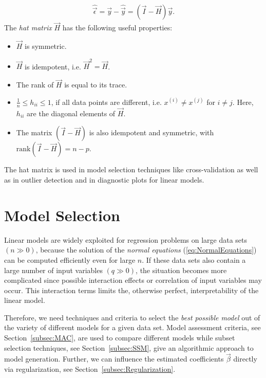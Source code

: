 \documentclass[10pt,a4paper]{report}
\begin{document}
\begin{align} \label{eq:residal_with_hat_matrix}
	\hat{\vec{\epsilon}} = \vec{y} - \hat{\vec{y}} = (\vec{I} - \vec{H}) \vec{y}.
\end{align}
%
The \emph{hat matrix} $\vec{H}$ has the following useful properties:

\begin{itemize}
	\item $\vec{H}$ is symmetric.
	\item $\vec{H}$ is idempotent, i.e. $\vec{H}^2 = \vec{H}$.
	\item The rank of $\vec{H}$ is equal to its trace.
 	\item $\frac{1}{n} \le h_{ii} \le 1$, if all data points are different, i.e. $x^{(i)} \ne x^{(j)}$ for $i \ne j$. Here, $h_{ii}$ are the diagonal elements of $\vec{H}$.
	\item The matrix $(\vec{I} - \vec{H})$ is also idempotent and symmetric, with $\mathrm{rank}(\vec{I} - \vec{H}) = n - p$.
\end{itemize}

The hat matrix is used in model selection techniques like cross-validation as well as in outlier detection and in diagnostic plots for linear models.

\section{Model Selection} \label{sec:ModelSelection}

Linear models are widely exploited for regression problems on large data sets $(n \gg 0)$, because the solution of the \emph{normal equations} (\ref{eq:NormalEquations}) can be computed efficiently even for large $n$. If these data sets also contain a large number of input variables $(q \gg 0)$, the situation becomes more complicated since possible interaction effects or correlation of input variables may occur. This interaction terms limits the, otherwise perfect, interpretability of the linear model. 

Therefore, we need techniques and criteria to select the \emph{best possible model} out of the variety of different models for a given data set. Model assessment criteria, see Section~\ref{subsec:MAC}, are used to compare different models while subset selection techniques, see Section~\ref{subsec:SSM}, give an algorithmic approach to model generation. Further, we can influence the estimated coefficients $\vec{\beta}$ directly via regularization, see Section~\ref{subsec:Regularization}. 
\end{document}
